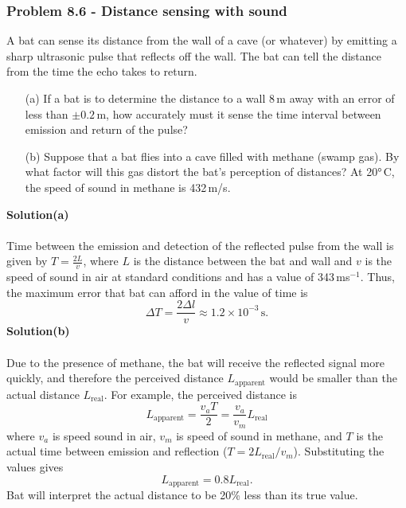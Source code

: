 \documentclass{article}
\begin{document}
\subsubsection*{Problem 8.6 - Distance sensing with sound}
A bat can sense its distance from the wall of a cave (or whatever) by emitting a sharp ultrasonic pulse that reflects off the wall. The bat can tell the distance from the time the echo takes to return.
\begin{enumerate}
    \item[(a)]If a bat is to determine the distance to a wall $8\,$m away with an error of less than $\pm0.2\,$m, how accurately must it sense the time interval between emission and return of the pulse?
    \item[(b)]Suppose that a bat flies into a cave filled with methane (swamp gas). By what factor will this gas distort the bat's perception of distances? At 20°\,C, the speed of sound in methane is 432\,m/s.
\end{enumerate}
\textbf{Solution(a)}
\\
\\Time between the emission and detection of the reflected pulse from the wall is given by $T=\frac{2L}{v}$, where $L$ is the distance between the bat and wall and $v$ is the speed of sound in air at standard conditions and has a value of 343\,ms$^{-1}$. Thus, the maximum error that bat can afford in the value of time is
\[\Delta T=\frac{2\Delta l}{v}\approx1.2\times10^{-3}\,\text{s}.\]
\textbf{Solution(b)}
\\
\\Due to the presence of methane, the bat will receive the reflected signal more quickly, and therefore the perceived distance $L_{\text{apparent}}$ would be smaller than the actual distance $L_{\text{real}}$. For example, the perceived distance is
\[L_{\text{apparent}}=\frac{v_aT}{2}=\frac{v_a}{v_m}L_{\text{real}}\]
where $v_a$ is speed sound in air, $v_m$ is speed of sound in methane, and $T$ is the actual time between emission and reflection ($T=2L_{\text{real}}/v_m$). Substituting the values gives
\[L_{\text{apparent}}=0.8L_{\text{real}}.\]
Bat will interpret the actual distance to be 20\% less than its true value.
\end{document}
